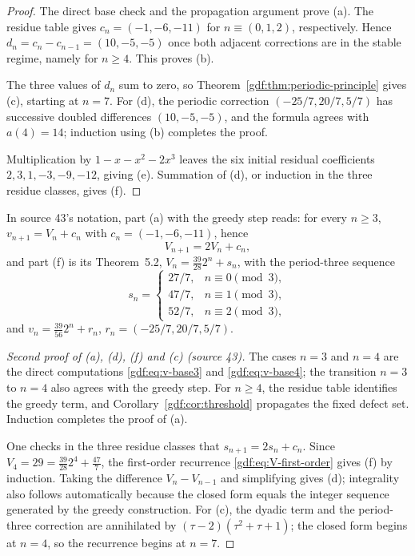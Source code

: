 \documentclass[11pt,a4paper]{article}
\numberwithin{equation}{section}
\theoremstyle{definition}
\theoremstyle{remark}
\theoremstyle{plain}
\newcommand{\src}[1]{\textup{(source #1)}}
\begin{document}
\begin{proof}
The direct base check and the propagation argument prove (a).  The residue
table gives $c_n=(-1,-6,-11)$ for $n\equiv(0,1,2)$, respectively.  Hence
$d_n=c_n-c_{n-1}=(10,-5,-5)$ once both adjacent corrections are in the stable
regime, namely for $n\ge4$.  This proves (b).

The three values of $d_n$ sum to zero, so Theorem~\ref{gdf:thm:periodic-principle}
gives (c), starting at $n=7$.  For (d), the periodic correction
$(-25/7,20/7,5/7)$ has successive doubled differences $(10,-5,-5)$, and the
formula agrees with $a(4)=14$; induction using (b) completes the proof.

Multiplication by $1-x-x^2-2x^3$ leaves the six initial residual coefficients
$2,3,1,-3,-9,-12$, giving (e).  Summation of (d), or induction in the three
residue classes, gives (f).
\end{proof}

In source 43's notation, part (a) with the greedy step reads: for every
$n\ge3$, $v_{n+1}=V_n+c_n$ with $c_n=(-1,-6,-11)$, hence
\begin{equation}\label{gdf:eq:V-first-order}
 V_{n+1}=2V_n+c_n,
\end{equation}
and part (f) is its Theorem~5.2, $V_n=\frac{39}{28}2^n+s_n$, with the
period-three sequence
\begin{equation}\label{gdf:eq:s-def}
 s_n=\begin{cases}
 27/7,&n\equiv0\pmod3,\\
 47/7,&n\equiv1\pmod3,\\
 52/7,&n\equiv2\pmod3,
 \end{cases}
\end{equation}
and $v_n=\frac{39}{56}2^n+r_n$, $r_n=(-25/7,20/7,5/7)$.

\begin{proof}[Second proof of (a), (d), (f) and (c) \src{43}]
The cases $n=3$ and $n=4$ are the direct computations
\eqref{gdf:eq:v-base3} and \eqref{gdf:eq:v-base4}; the transition $n=3$ to
$n=4$ also agrees with the greedy step.  For $n\ge4$, the residue table
identifies the greedy term, and Corollary~\ref{gdf:cor:threshold} propagates
the fixed defect set.  Induction completes the proof of (a).

One checks in the three residue classes that $s_{n+1}=2s_n+c_n$.  Since
$V_4=29=\frac{39}{28}2^4+\frac{47}7$, the first-order recurrence
\eqref{gdf:eq:V-first-order} gives (f) by induction.  Taking the difference
$V_n-V_{n-1}$ and simplifying gives (d); integrality also follows
automatically because the closed form equals the integer sequence generated
by the greedy construction.  For (c), the dyadic term and the period-three
correction are annihilated by $(\tau-2)(\tau^2+\tau+1)$; the closed form
begins at $n=4$, so the recurrence begins at $n=7$.
\end{proof}
\end{document}

